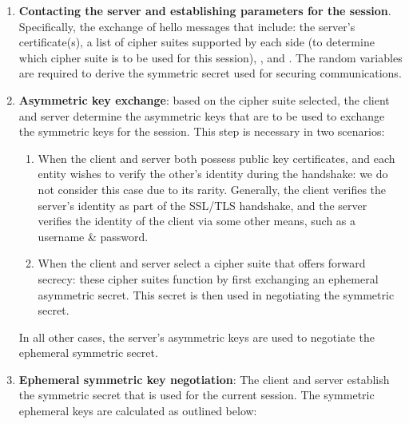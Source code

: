 \documentclass[../main.tex]{subfiles}
\begin{document}
\begin{enumerate}
  \item \textbf{Contacting the server and establishing parameters for
    the session}. Specifically, the exchange of hello messages that
    include: the server's certificate(s), a list of cipher suites supported by
    each side (to determine which cipher suite is to be used for this session),
    \srandom, and \crandom. The random variables are required to derive the
    symmetric secret used for securing communications.
  \item \textbf{Asymmetric key exchange}: based on the cipher suite
    selected, the client and server determine the asymmetric keys that are
    to be used to exchange the symmetric keys for the session. This step
    is necessary in two scenarios:
    \begin{enumerate}
      \item When the client and server both possess public key
        certificates, and each entity wishes to verify the other's identity
        during the handshake: we do not consider this case due to its
        rarity. Generally, the client verifies the server's identity as part
        of the SSL/TLS handshake, and the server verifies the identity of the
        client via some other means, such as a username \& password.
      \item When the client and server select a cipher suite that offers
        forward secrecy: these cipher suites function by first exchanging an
        ephemeral asymmetric secret. This secret is then used in
        negotiating the symmetric secret.
    \end{enumerate} In all other cases, the server's asymmetric keys
    are used to negotiate the ephemeral symmetric secret.
  \item \textbf{Ephemeral symmetric key negotiation}: The client and
    server establish the symmetric secret that is used for the current
    session. The symmetric ephemeral keys are calculated as outlined
    below:


\end{enumerate}
\end{document}

